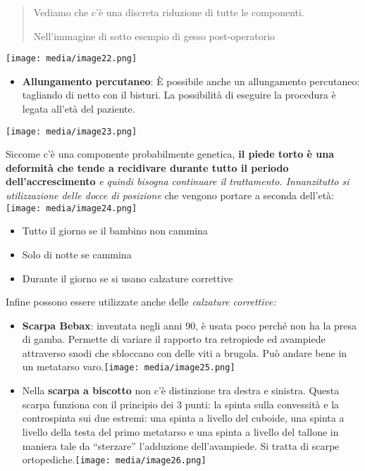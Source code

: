 \documentclass[]{article}
\begin{document}
\begin{quote}
Vediamo che c'è una discreta riduzione di tutte le componenti.

Nell'immagine di sotto esempio di gesso post-operatorio
\end{quote}

\texttt{[image: media/image22.png]}

\begin{itemize}
\item
  \textbf{Allungamento percutaneo}: È possibile anche un allungamento
  percutaneo: tagliando di netto con il bisturi. La possibilità di
  eseguire la procedura è legata all'età del paziente.
\end{itemize}

\texttt{[image: media/image23.png]}

Siccome c'è una componente probabilmente genetica, \textbf{il piede
torto è una deformità che tende a recidivare durante tutto il periodo
dell'accrescimento} \emph{e quindi bisogna continuare il trattamento.
Innanzitutto si utilizzazione delle \emph{docce di posizione }}che
vengono portare a seconda dell'età:
\texttt{[image: media/image24.png]}

\begin{itemize}
\item
  Tutto il giorno se il bambino non cammina
\item
  Solo di notte se cammina
\item
  Durante il giorno se si usano calzature correttive
\end{itemize}

Infine possono essere utilizzate anche delle \emph{calzature
correttive:}

\begin{itemize}
\item
  \textbf{Scarpa Bebax}: inventata negli anni 90, è usata poco perché
  non ha la presa di gamba. Permette di variare il rapporto tra
  retropiede ed avampiede attraverso snodi che sbloccano con delle viti
  a brugola. Può andare bene in un metatarso
  varo.\texttt{[image: media/image25.png]}
\item
  Nella \textbf{scarpa a biscotto} non c'è distinzione tra destra e
  sinistra. Questa scarpa funziona con il principio dei 3 punti: la
  spinta sulla convessità e la controspinta sui due estremi: una spinta
  a livello del cuboide, una spinta a livello della testa del primo
  metatarso e una spinta a livello del tallone in maniera tale da
  ``sterzare'' l'adduzione dell'avampiede. Si tratta di scarpe
  ortopediche.\texttt{[image: media/image26.png]}
\end{itemize}
\end{document}
